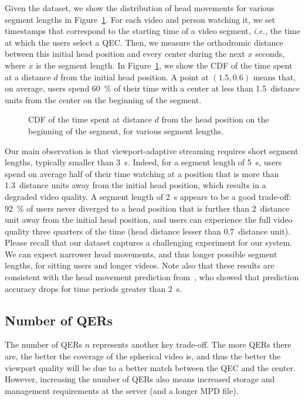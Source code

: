 Given the dataset, we show the distribution of head movements for
various segment lengths in Figure~\ref{cdf-dataset}. For each video
and person watching it, we set timestamps that correspond to the
starting time of a video segment, \textit{i.e.,} the time at which the
users select a \ac{QEC}. Then, we measure the orthodromic distance
between this initial head position and every \FoV{} center during
the next $x$ seconds, where $x$ is the segment length. In
Figure~\ref{cdf-dataset}, we show the \ac{CDF} of the time spent at a
distance $d$ from the initial head position.
A point at $(1.5,0.6)$
means that, on average, users spend \SI{60}{\percent} of their time
with a \FoV{} center at less than \num{1.5}~distance units from the
\FoV{} center on the beginning of the segment.

\begin{figure}
\centering

\caption{CDF of the time spent at distance $d$ from the head position on the beginning of the
segment, for various segment lengths.}\label{cdf-dataset}
\end{figure}

Our main observation is that viewport-adaptive streaming requires
short segment lengths, typically smaller than \SI{3}{\second}. Indeed,
for a segment length of \SI{5}{\second}, users spend on average half of
their time watching at a position that is more than
\num{1.3}~distance units away from the initial head position, which
results in a degraded video quality. A segment length of
\SI{2}{\second} appears to be a good trade-off: \SI{92}{\percent} of
users never diverged to a head position that is further than
\num{2}~distance unit away from the initial head position, and users
can experience the full video quality three quarters of the time (head distance
lesser than \num{0.7}~distance unit). Please recall that our dataset
captures a challenging experiment for our system. We can expect
narrower head movements, and thus longer possible segment lengths, for
sitting users and longer videos. Note also that these results are consistent
with the head movement prediction from~\citet{allthings}, who showed that
prediction accuracy drops for time periods greater than \SI{2}{\second}.

\subsection{Number of \acp{QER}}

The number of \acp{QER} $n$ represents another key trade-off. The more
\acp{QER} there are, the better the coverage of the spherical video
is, and thus the better the viewport quality will be due to a better
match between the \ac{QEC} and the \FoV{} center. However,
increasing the number of \acp{QER} also means increased storage and
management requirements at the server (and a longer \ac{MPD} file).


